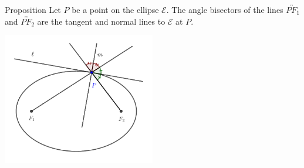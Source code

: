 \documentclass[compress,aspectratio=169,10pt,usenames,dvipsnames]{beamer}
\begin{document}

\begin{frame}

\vfill

\begin{block}{Proposition}
Let $P$ be a point on the ellipse $\mathcal{E}$. The angle bisectors of the lines $\overleftrightarrow{PF_1}$ and $\overleftrightarrow{PF_2}$ are the tangent and normal lines to $\mathcal{E}$ at $P$.  
\end{block}

\vfill


\begin{center}
\includegraphics[width=0.5\textwidth]{EllipseProp1WTS}
\end{center}

\vfill


\end{frame}

\end{document}
